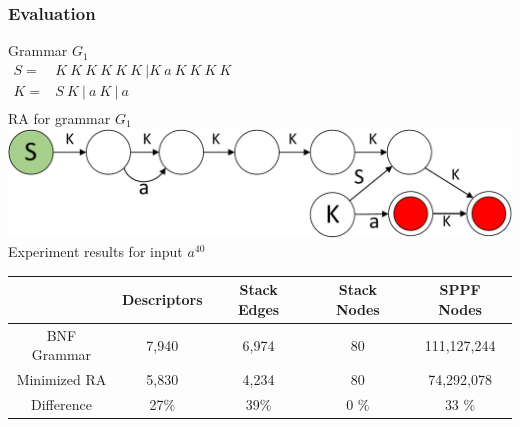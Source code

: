 \documentclass{beamer}
\begin{document}
	\begin{frame} 
		\frametitle{Evaluation}
		\begin{center}
		\vspace{-10pt}
		Grammar $G_1$\\
		\vspace{6pt}
		$
		\begin{array}{rl}
		S =& K\ K\ K\ K\ K\ K \ | K\ a\ K\ K\ K\ K \\
		K =& S\ K\ |\ a\ K\ |\ a \\
		\end{array}
		$
		\\
		\vspace{15pt}
		RA for grammar $G_1$
		\\
		\vspace{6pt}
		\includegraphics[scale=.5]{pictures/G1automaton.pdf}
		\\
		\vspace{7pt}
		Experiment results for input $a^{40}$
		\\
		\vspace{2pt}
		\begin{tabular}{ | c | c | c | c | c | }
			\hline
             &  Descriptors & Stack Edges & Stack Nodes & SPPF Nodes   \\ \hline
			BNF Grammar  &  7,940        & 6,974      & 80        & 111,127,244  \\ \hline
			Minimized RA &  5,830        & 4,234      & 80        & 74,292,078  \\ \hline \hline
			Difference   &  27$\%$       & 39$\%$     & 0 $\%$    &  33 $\%$ \\ \hline
		\end{tabular}
		\end{center}
	\end{frame}
	
\end{document}
